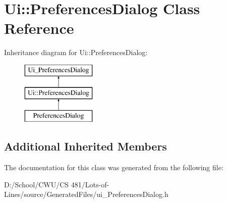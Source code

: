 \hypertarget{class_ui_1_1_preferences_dialog}{}\section{Ui\+:\+:Preferences\+Dialog Class Reference}
\label{class_ui_1_1_preferences_dialog}
Inheritance diagram for Ui\+:\+:Preferences\+Dialog\+:\begin{figure}[H]
\begin{center}
\leavevmode
\includegraphics[height=3.000000cm]{class_ui_1_1_preferences_dialog}
\end{center}
\end{figure}
\subsection*{Additional Inherited Members}


The documentation for this class was generated from the following file\+:\begin{DoxyCompactItemize}
\item 
D\+:/\+School/\+C\+W\+U/\+C\+S 481/\+Lots-\/of-\/\+Lines/source/\+Generated\+Files/ui\+\_\+\+Preferences\+Dialog.\+h\end{DoxyCompactItemize}

